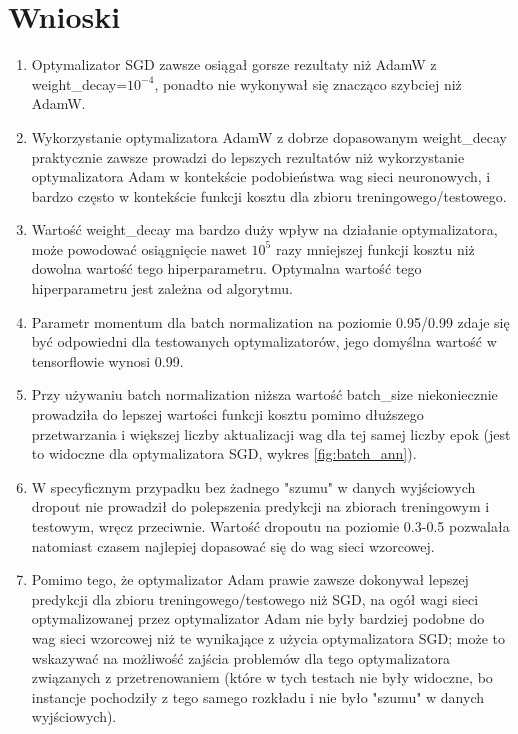 \documentclass[12pt]{article}
\begin{document}
\section{Wnioski}\label{tit:wniosko}
\begin{enumerate}
	\item Optymalizator SGD zawsze osiągał gorsze rezultaty niż AdamW z weight\_decay=$10^{-4}$, ponadto nie wykonywał się znacząco szybciej niż AdamW.
	\item Wykorzystanie optymalizatora AdamW z dobrze dopasowanym weight\_decay praktycznie zawsze prowadzi do lepszych rezultatów niż wykorzystanie optymalizatora Adam w kontekście podobieństwa wag sieci neuronowych, i bardzo często w kontekście funkcji kosztu dla zbioru treningowego/testowego.
	\item Wartość weight\_decay ma bardzo duży wpływ na działanie optymalizatora, może powodować osiągnięcie nawet $10^5$ razy mniejszej funkcji kosztu niż dowolna wartość tego hiperparametru. Optymalna wartość tego hiperparametru jest zależna od algorytmu.
	\item Parametr momentum dla batch normalization na poziomie 0.95/0.99 zdaje się być odpowiedni dla testowanych optymalizatorów, jego domyślna wartość w tensorflowie wynosi 0.99.
	\item Przy używaniu batch normalization niższa wartość batch\_size niekoniecznie prowadziła do lepszej wartości funkcji kosztu pomimo dłuższego przetwarzania i większej liczby aktualizacji wag dla tej samej liczby epok (jest to widoczne dla optymalizatora SGD, wykres \ref{fig:batch_ann}).
	\item W specyficznym przypadku bez żadnego "szumu" w danych wyjściowych dropout nie prowadził do polepszenia predykcji na zbiorach treningowym i testowym, wręcz przeciwnie. Wartość dropoutu na poziomie 0.3-0.5 pozwalała natomiast czasem najlepiej dopasować się do wag sieci wzorcowej.
	\item Pomimo tego, że optymalizator Adam prawie zawsze dokonywał lepszej predykcji dla zbioru treningowego/testowego niż SGD, na ogół wagi sieci optymalizowanej przez optymalizator Adam nie były bardziej podobne do wag sieci wzorcowej niż te wynikające z użycia optymalizatora SGD; może to wskazywać na możliwość zajścia problemów dla tego optymalizatora związanych z przetrenowaniem (które w tych testach nie były widoczne, bo instancje pochodziły z tego samego rozkładu i nie było "szumu" w danych wyjściowych).
\end{enumerate}
\end{document}
